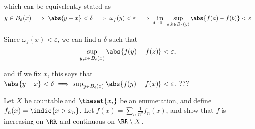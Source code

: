 \begin{solution}
\begin{enumerate}
  which can be equivalently stated as
  $$
  y\in B_\delta(x) \implies \abs{y - x} < \delta \implies
  \omega_f(y) < \varepsilon \implies
  \lim_{\delta\to 0^+} \sup_{a,b \in B_\delta(y)}\abs{f(a) - f(b)} < \varepsilon
  $$

  Since $\omega_f(x) < \varepsilon$, we can find a $\delta$ such that
  $$
  \sup_{y,z \in B_{\delta}(x)} \abs{f(y) - f(z)} < \varepsilon,
  $$

  and if we fix $x$, this says that $\abs{y - x} < \delta \implies \sup_{y \in B_\delta(x)} \abs{f(y) - f(x)} < \varepsilon$. ???
\end{enumerate}
\end{solution}

\begin{problem}
  Let $X$ be countable and $\theset{x_i}$ be an enumeration, and define $f_n(x) = \indic{x > x_n}$. Let $f(x) = \sum_n \frac 1 {n^2} f_n(x)$, and show that $f$ is increasing on $\RR$ and continuous on $\RR\setminus X$.
\end{problem}

